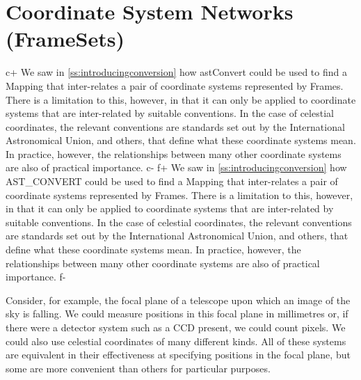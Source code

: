 \documentclass[twoside,11pt]{article}
\newcommand{\secref}[1]{\S\ref{#1}}
\renewcommand{\secref}[1]{\ref{#1}}
\begin{document}
%
%

\cleardoublepage
\section{\label{ss:framesets}Coordinate System Networks (FrameSets)}

c+
We saw in \secref{ss:introducingconversion} how astConvert could be
used to find a Mapping that inter-relates a pair of coordinate systems
represented by Frames. There is a limitation to this, however, in that
it can only be applied to coordinate systems that are inter-related by
suitable conventions. In the case of celestial coordinates, the
relevant conventions are standards set out by the International
Astronomical Union, and others, that define what these coordinate
systems mean. In practice, however, the relationships between many
other coordinate systems are also of practical importance.
c-
f+
We saw in \secref{ss:introducingconversion} how AST\_CONVERT could be
used to find a Mapping that inter-relates a pair of coordinate systems
represented by Frames. There is a limitation to this, however, in that
it can only be applied to coordinate systems that are inter-related by
suitable conventions. In the case of celestial coordinates, the
relevant conventions are standards set out by the International
Astronomical Union, and others, that define what these coordinate
systems mean. In practice, however, the relationships between many
other coordinate systems are also of practical importance.
f-

Consider, for example, the focal plane of a telescope upon which an
image of the sky is falling. We could measure positions in this focal
plane in millimetres or, if there were a detector system such as a CCD
present, we could count pixels. We could also use celestial
coordinates of many different kinds. All of these systems are
equivalent in their effectiveness at specifying positions in the focal
plane, but some are more convenient than others for particular
purposes.
\end{document}
